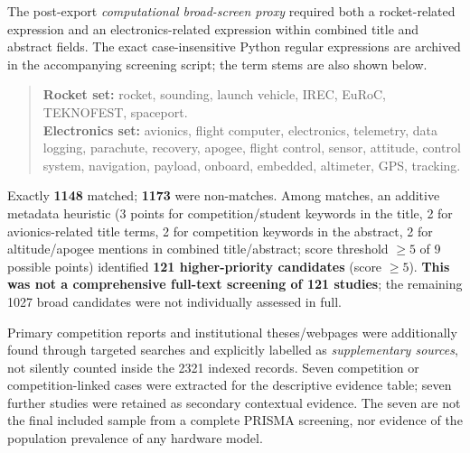 \documentclass[10pt,a4paper]{article}
\begin{document}
The post-export \emph{computational broad-screen proxy} required both a rocket-related expression and an electronics-related expression within combined title and abstract fields. The exact case-insensitive Python regular expressions are archived in the accompanying screening script; the term stems are also shown below.
\begin{quote}\footnotesize
\textbf{Rocket set:} rocket, sounding, launch vehicle, IREC, EuRoC, TEKNOFEST, spaceport.\\
\textbf{Electronics set:} avionics, flight computer, electronics, telemetry, data logging, parachute, recovery, apogee, flight control, sensor, attitude, control system, navigation, payload, onboard, embedded, altimeter, GPS, tracking.
\end{quote} Exactly \textbf{1148} matched; \textbf{1173} were non-matches. Among matches, an additive metadata heuristic (3 points for competition/student keywords in the title, 2 for avionics-related title terms, 2 for competition keywords in the abstract, 2 for altitude/apogee mentions in combined title/abstract; score threshold $\ge5$ of 9 possible points) identified \textbf{121 higher-priority candidates} (score $\geq5$). \textbf{This was not a comprehensive full-text screening of 121 studies}; the remaining 1027 broad candidates were not individually assessed in full.

Primary competition reports and institutional theses/webpages were additionally found through targeted searches and explicitly labelled as \emph{supplementary sources}, not silently counted inside the 2321 indexed records. Seven competition or competition-linked cases were extracted for the descriptive evidence table; seven further studies were retained as secondary contextual evidence. The seven are not the final included sample from a complete PRISMA screening, nor evidence of the population prevalence of any hardware model.
\end{document}
